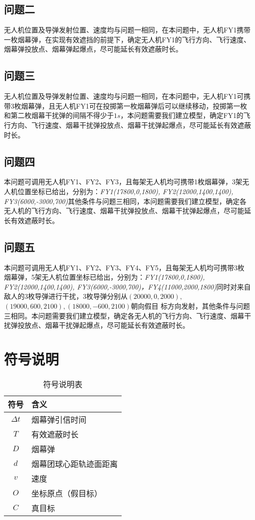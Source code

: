\documentclass{article}
\begin{document}
\subsection{问题二}

无人机位置及导弹发射位置、速度均与问题一相同，在本问题中，无人机FY1携带一枚烟幕弹，在实现有效遮挡的前提下，确定无人机FY1的飞行方向、飞行速度、烟幕弹投放点、烟幕弹起爆点，尽可能延长有效遮蔽时长。
\subsection{问题三}

无人机位置及导弹发射位置、速度均与问题一相同，在本问题中，无人机FY1可携带3枚烟幕弹，且无人机FY1可在投掷第一枚烟幕弹后可以继续移动，投掷第一枚和第二枚烟幕干扰弹的间隔不得少于$1s$，本问题需要我们建立模型，确定FY1的飞行方向、飞行速度、烟幕干扰弹投放点、烟幕干扰弹起爆点，尽可能延长有效遮蔽时长。
\subsection{问题四}

本问题可调用无人机FY1、FY2、FY3，且每架无人机均可携带1枚烟幕弹，3架无人机位置坐标已给出，分别为：\textit{FY1(17800,0,1800), FY2(12000,1400,1400), FY3(6000,-3000,700)}其他条件与问题三相同，本问题需要我们建立模型，确定各无人机的飞行方向、飞行速度、烟幕干扰弹投放点、烟幕干扰弹起爆点，尽可能延长有效遮蔽时长。
\subsection{问题五}

本问题可调用无人机FY1、FY2、FY3、FY4、FY5，且每架无人机均可携带3枚烟幕弹，5架无人机位置坐标已给出，分别为：\textit{FY1(17800,0,1800), FY2(12000,1400,1400), FY3(6000,-3000,700)，FY4(11000,2000,1800)}同时对来自敌人的3枚导弹进行干扰，3枚导弹分别从$(20000,0,2000),$$(19000,600,2100),(18000,-600,2100)$朝向假目
标方向发射，其他条件与问题三相同。本问题需要我们建立模型，确定各无人机的飞行方向、飞行速度、烟幕干扰弹投放点、烟幕干扰弹起爆点，尽可能延长有效遮蔽时长。

\section{符号说明}

\begin{table}[H]
\centering
\caption{符号说明表}
\begin{tabular}{|c|l|}
\hline
符号 & 含义 \\
\hline
$\Delta t$ & 烟幕弹引信时间 \\
$T$ & 有效遮蔽时长 \\
$D$ & 烟幕弹 \\
$d$ & 烟幕团球心距轨迹面距离 \\
$v$ & 速度 \\
$O$ & 坐标原点（假目标） \\
$C$ & 真目标 \\
\hline
\end{tabular}
\end{table}
\end{document}
